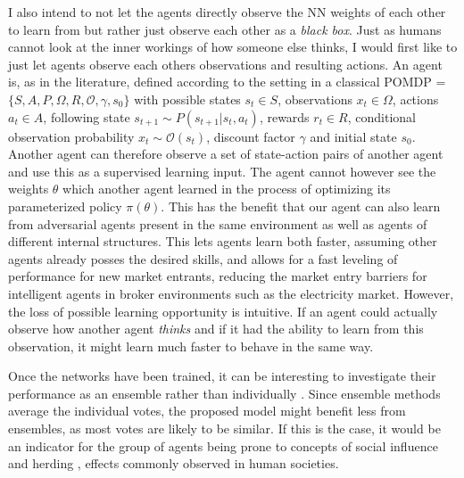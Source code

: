 \documentclass[12pt,a4paper]{article}
\begin{document}
I also intend to not let the agents directly observe the NN weights of each other to learn from but rather just observe
each other as a \emph{black box}. Just as humans cannot look at the inner workings of how someone else thinks, I would
first like to just let agents observe each others observations and resulting actions.  An agent is, as in the
literature, defined according to the setting in a classical \ac{POMDP} = $ \{ S, A, P, \Omega, R, \mathcal{O}, \gamma,
s_0 \}$ with possible states $s_t \in S$, observations $x_t \in \Omega$, actions $a_t \in A$, following state $s_{t+1}
\sim P(s_{t+1} \vert s_t, a_t)$, rewards $r_t \in R$, conditional observation probability $x_t \sim \mathcal{O}(s_t)$,
discount factor $\gamma$ and initial state $s_0$.  Another agent can therefore observe a set of state-action pairs of
another agent and use this as a supervised learning input. The agent cannot however see the weights $\theta$ which
another agent learned in the process of optimizing its parameterized policy $\pi(\theta)$.  This has the benefit that
our agent can also learn from adversarial agents present in the same environment as well as agents of different internal
structures. This lets agents learn both faster, assuming other agents already posses the desired skills, and allows for
a fast leveling of performance for new market entrants, reducing the market entry barriers for intelligent agents in
broker environments such as the electricity market.  However, the loss of possible learning opportunity is intuitive. If
an agent could actually observe how another agent \emph{thinks} and if it had the ability to learn from this
observation, it might learn much faster to behave in the same way.


Once the networks have been trained, it can be interesting to investigate their performance as an ensemble rather than
individually \cite{opitz1999popular}. Since ensemble methods average the individual votes, the proposed model might
benefit less from ensembles, as most votes are likely to be similar. If this is the case, it would be an indicator for
the group of agents being prone to concepts of social influence and herding \cite{2015-45614-00120160201,
hirshleifer1994blind}, effects commonly observed in human societies.
\end{document}
